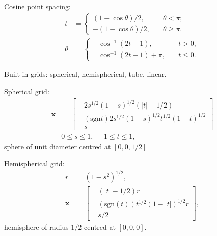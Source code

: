 \documentclass[a4paper,12pt]{article}
\newcommand{\sgn}{\mathrm{sgn}}
\begin{document}
Cosine point spacing:
\begin{subequations}
  \begin{align}
    t &=
    \left\{
      \begin{aligned}
        (1-\cos\theta)/2,  & \quad\theta < \pi;\\
        -(1-\cos\theta)/2, & \quad\theta \geq \pi.
      \end{aligned}
    \right.\\
    \theta &=
    \left\{
    \begin{aligned}
      &\cos^{-1}(2t-1), &\quad t > 0,\\
      &\cos^{-1}(2t+1) + \pi, &\quad t \leq 0.
    \end{aligned}
    \right.
  \end{align}
\end{subequations}

Built-in grids: spherical,  hemispherical, tube, linear. 

Spherical grid:
\begin{align}
  \mathbf{x}
  &=
  \left[
    \begin{aligned}
      &2s^{1/2}(1-s)^{1/2}(|t|-1/2)\\
      &(\sgn{t})2s^{1/2}(1-s)^{1/2}t^{1/2}(1-t)^{1/2}\\
      &s
    \end{aligned}
  \right]\\
  &0\leq s\leq 1,\, -1\leq t\leq 1,
\end{align}
sphere of unit diameter centred at $[0,0,1/2]$

Hemispherical grid:
\begin{align}
  r &= (1-s^{2})^{1/2},\\
  \mathbf{x}
  &=
  \left[
    \begin{aligned}
      &(|t|-1/2)r\\
      &(\sgn(t))t^{1/2}(1-|t|)^{1/2}r\\
      &s/2
    \end{aligned}
  \right],
\end{align}
hemisphere of radius $1/2$ centred at $[0,0,0]$. 
\end{document}
